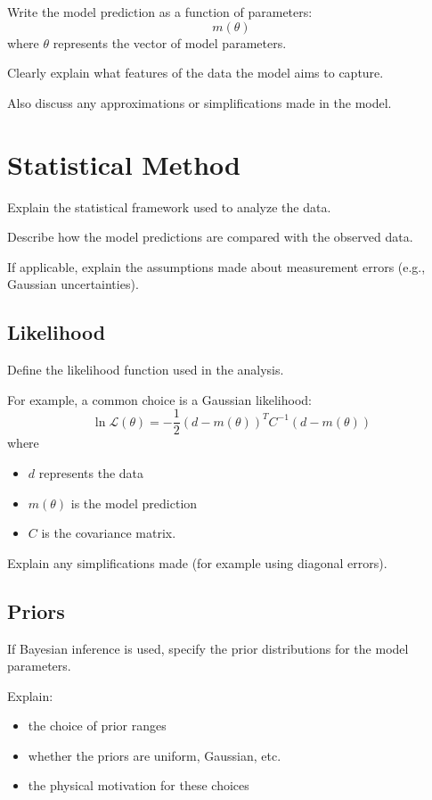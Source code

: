 \documentclass[11pt]{article}
\begin{document}
Write the model prediction as a function of parameters:
\begin{equation}
    m(\theta)
\end{equation}
where $\theta$ represents the vector of model parameters.

Clearly explain what features of the data the model aims to capture.

Also discuss any approximations or simplifications made in the model.

\section{Statistical Method}

Explain the statistical framework used to analyze the data.

Describe how the model predictions are compared with the observed data.

If applicable, explain the assumptions made about measurement errors
(e.g., Gaussian uncertainties).

\subsection{Likelihood}

Define the likelihood function used in the analysis.

For example, a common choice is a Gaussian likelihood:
\begin{equation}
\ln \mathcal{L}(\theta)
=
-\frac{1}{2}(d-m(\theta))^{T}C^{-1}(d-m(\theta))
\end{equation}
where
\begin{itemize}
\item $d$ represents the data
\item $m(\theta)$ is the model prediction
\item $C$ is the covariance matrix.
\end{itemize}

Explain any simplifications made (for example using diagonal errors).

\subsection{Priors}

If Bayesian inference is used, specify the prior distributions
for the model parameters.

Explain:
\begin{itemize}
\item the choice of prior ranges
\item whether the priors are uniform, Gaussian, etc.
\item the physical motivation for these choices
\end{itemize}
\end{document}

